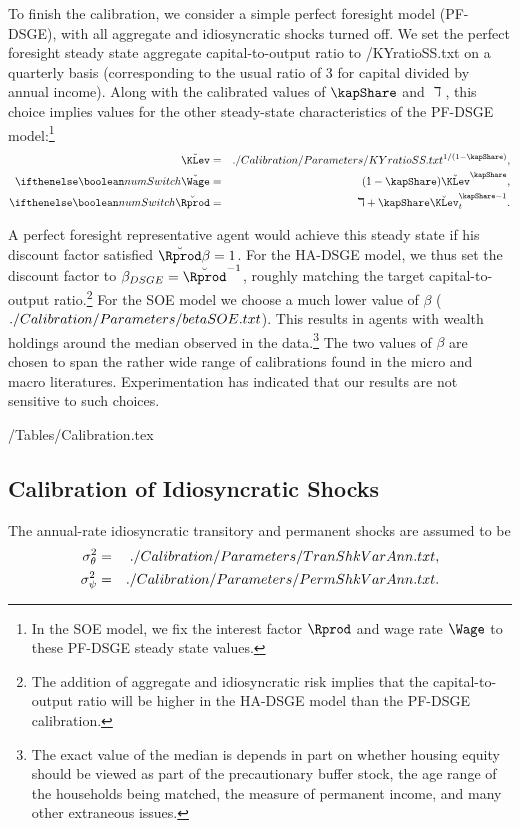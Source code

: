 \documentclass[titlepage]{\econtex}\newcommand{\texname}{cAndCwithStickyE}
\begin{document}
To finish the calibration, we consider a simple perfect foresight model (PF-DSGE), with all aggregate and idiosyncratic shocks turned off.  We set the perfect foresight steady state aggregate capital-to-output ratio to  \ParmDir/KYratioSS.txt on a quarterly basis (corresponding to the usual ratio of 3 for capital divided by annual income).  Along with the calibrated values of $\kapShare$ and $\daleth$, this choice implies values for the other steady-state characteristics of the PF-DSGE model:\footnote{In the SOE model, we fix the interest factor $\Rprod$ and wage rate $\Wage$ to these PF-DSGE steady state values.}
\begin{eqnarray*}
   \breve{\KLev} & = &  \ParmDir/KYratioSS.txt ^{1/(1-\kapShare)},
\\ \ifnumSw \breve{\Wage} & = & (1-\kapShare) \breve{\KLev}^{\kapShare},
\\ \ifnumSw \breve{\Rprod} & = & \daleth+\kapShare \breve{\KLev}^{\kapShare-1}_{t}
.
\end{eqnarray*}

A perfect foresight representative agent would achieve this steady state if his discount factor satisfied $\breve{\Rprod} \beta = 1$.  For the HA-DSGE model, we thus set the discount factor to $\beta_{DSGE} = \breve{\Rprod}^{-1}$, roughly matching the target capital-to-output ratio.\footnote{The addition of aggregate and idiosyncratic risk implies that the capital-to-output ratio will be higher in the HA-DSGE model than the PF-DSGE calibration.} For the SOE model we choose a much lower value of $\beta$ ($  ./Calibration/Parameters/betaSOE.txt $). This results in agents with wealth holdings around the median observed in the data.\footnote{The exact value of the median is depends in part on whether housing equity should be viewed as part of the precautionary buffer stock, the age range of the households being matched, the measure of permanent income, and many other extraneous issues.}  The two values of $\beta$ are chosen to span the rather wide range of calibrations found in the micro and macro literatures.  Experimentation has indicated that our results are not sensitive to such choices.

\econtexRoot/Tables/Calibration.tex

\subsection{Calibration of Idiosyncratic Shocks}

The annual-rate idiosyncratic transitory and permanent shocks are assumed to be
\begin{eqnarray*}
   \sigma_{\theta}^{2} & = &  ./Calibration/Parameters/TranShkVarAnn.txt ,
\\ \sigma_{\psi}^{2}             & = &  ./Calibration/Parameters/PermShkVarAnn.txt
.
\end{eqnarray*}
\end{document}
